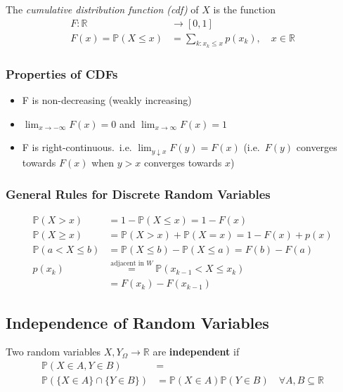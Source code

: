 
The \textit{cumulative distribution function (cdf)} of $X$ is the function
\noindent\begin{align*}
    F:\mathbb{R}            & \rightarrow [0,1]                             \\
    F(x)=\mathbb P(X\leq x) & =\sum_{k:x_k\leq x}p(x_k),\quad x\in\mathbb R
\end{align*}

\subsubsection{Properties of CDFs}
\begin{itemize}
    \item F is non-decreasing (weakly increasing)
    \item $\lim_{x\rightarrow -\infty}F(x)=0$ and $\lim_{x\rightarrow \infty}F(x)=1$
    \item F is right-continuous.\ i.e. $\lim_{y\downarrow x} F(y) =F(x)$ (i.e.\ $F(y)$ converges towards $F(x)$ when $y>x$ converges towards $x$)
\end{itemize}

\subsubsection{General Rules for Discrete Random Variables}
\noindent\begin{align*}
    \mathbb{P}(X>x)       & =1-\mathbb{P}(X\leq x)=1-F(x)                                   \\
    \mathbb{P}(X\geq x)   & =\mathbb{P}(X>x)+\mathbb{P}(X=x)=1-F(x)+p(x)                    \\
    \mathbb{P}(a<X\leq b) & =\mathbb{P}(X\leq b)-\mathbb{P}(X\leq a)=F(b)-F(a)              \\
    p(x_k)                & \overset{\text{adjacent in } W}{=}\mathbb{P}(x_{k-1}<X\leq x_k) \\
                          & =F(x_k)-F(x_{k-1})
\end{align*}

\subsection{Independence of Random Variables}
Two random variables $X,Y_\Omega \rightarrow\mathbb{R}$ are \textbf{independent} if
\noindent\begin{align*}
    \mathbb{P}(X\in A,Y\in B)            & =                                                                        \\
    \mathbb{P}(\{X\in A\}\cap\{Y\in B\}) & =\mathbb{P}(X\in A)\mathbb{P}(Y\in B)\quad\forall A,B\subseteq\mathbb{R}
\end{align*}

